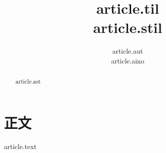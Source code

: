 \documentclass[]{article}
\title{
    {{ article.til }} \\ \small {{ article.stil }}
}
\author{
	{{ article.aut }} \\ {{ article.aino }} \\
}
\begin{document}
\maketitle

\begin{abstract}
{{ article.ast }}
\end{abstract}

\section{正文}
{{ article.text }}
\end{document}
